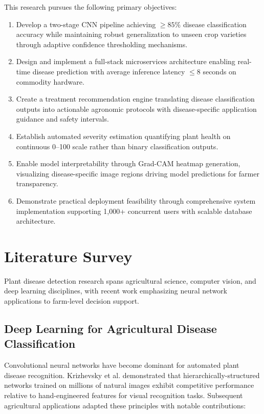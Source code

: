 \documentclass[conference]{IEEEtran}
\begin{document}
This research pursues the following primary objectives:

\begin{enumerate}
\item Develop a two-stage CNN pipeline achieving $\geq 85\%$ disease classification accuracy while maintaining robust generalization to unseen crop varieties through adaptive confidence thresholding mechanisms.

\item Design and implement a full-stack microservices architecture enabling real-time disease prediction with average inference latency $\leq 8$ seconds on commodity hardware.

\item Create a treatment recommendation engine translating disease classification outputs into actionable agronomic protocols with disease-specific application guidance and safety intervals.

\item Establish automated severity estimation quantifying plant health on continuous 0--100 scale rather than binary classification outputs.

\item Enable model interpretability through Grad-CAM heatmap generation, visualizing disease-specific image regions driving model predictions for farmer transparency.

\item Demonstrate practical deployment feasibility through comprehensive system implementation supporting 1,000+ concurrent users with scalable database architecture.
\end{enumerate}

\section{Literature Survey}

Plant disease detection research spans agricultural science, computer vision, and deep learning disciplines, with recent work emphasizing neural network applications to farm-level decision support.

\subsection{Deep Learning for Agricultural Disease Classification}

Convolutional neural networks have become dominant for automated plant disease recognition. Krizhevsky et al. \cite{ref02} demonstrated that hierarchically-structured networks trained on millions of natural images exhibit competitive performance relative to hand-engineered features for visual recognition tasks. Subsequent agricultural applications adapted these principles with notable contributions:
\end{document}
